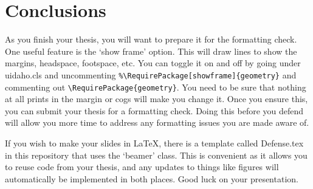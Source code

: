 \chapter{Conclusions}
\label{Chapter:Conclusion}

As you finish your thesis, you will want to prepare it for the formatting check. One useful feature is the `show frame' option. This will draw lines to show the margins, headspace, footspace, etc. You can toggle it on and off by going under uidaho.cls and uncommenting \verb|%\RequirePackage[showframe]{geometry}| and commenting out 
\verb|\RequirePackage{geometry}|. You need to be sure that nothing at all prints in the margin or \acs{cogs} will make you change it. Once you ensure this, you can submit your thesis for a formatting check. Doing this before you defend will allow you more time to address any formatting issues you are made aware of.

If you wish to make your slides in \LaTeX, there is a template called Defense.tex in this repository that uses the `beamer' class. This is convenient as it allows you to reuse code from your thesis, and any updates to things like figures will automatically be implemented in both places. Good luck on your presentation.